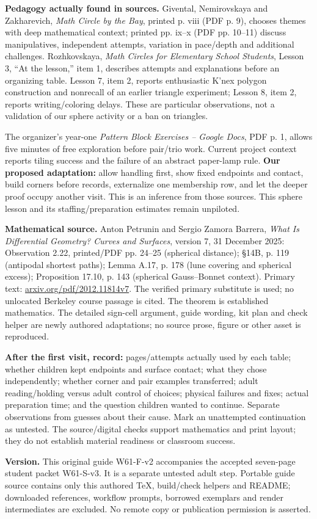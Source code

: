 \documentclass[11pt,letterpaper]{article}
\begin{document}
\textbf{Pedagogy actually found in sources.} Givental, Nemirovskaya and Zakharevich, \emph{Math Circle by the Bay}, printed p. viii (PDF p. 9), chooses themes with deep mathematical context; printed pp. ix--x (PDF pp. 10--11) discuss manipulatives, independent attempts, variation in pace/depth and additional challenges. Rozhkovskaya, \emph{Math Circles for Elementary School Students}, Lesson 3, ``At the lesson,'' item 1, describes attempts and explanations before an organizing table. Lesson 7, item 2, reports enthusiastic K'nex polygon construction and nonrecall of an earlier triangle experiment; Lesson 8, item 2, reports writing/coloring delays. These are particular observations, not a validation of our sphere activity or a ban on triangles.

The organizer's year-one \emph{Pattern Block Exercises -- Google Docs}, PDF p. 1, allows five minutes of free exploration before pair/trio work. Current project context reports tiling success and the failure of an abstract paper-lamp rule. \textbf{Our proposed adaptation:} allow handling first, show fixed endpoints and contact, build corners before records, externalize one membership row, and let the deeper proof occupy another visit. This is an inference from those sources. This sphere lesson and its staffing/preparation estimates remain unpiloted.

\textbf{Mathematical source.} Anton Petrunin and Sergio Zamora Barrera, \emph{What Is Differential Geometry? Curves and Surfaces}, version 7, 31 December 2025: Observation 2.22, printed/PDF pp. 24--25 (spherical distance); \S14B, p. 119 (antipodal shortest paths); Lemma A.17, p. 178 (lune covering and spherical excess); Proposition 17.10, p. 143 (spherical Gauss--Bonnet context). Primary text: \href{https://arxiv.org/pdf/2012.11814v7}{arxiv.org/pdf/2012.11814v7}. The verified primary substitute is used; no unlocated Berkeley course passage is cited. The theorem is established mathematics. The detailed sign-cell argument, guide wording, kit plan and check helper are newly authored adaptations; no source prose, figure or other asset is reproduced.

\textbf{After the first visit, record:} pages/attempts actually used by each table; whether children kept endpoints and surface contact; what they chose independently; whether corner and pair examples transferred; adult reading/holding versus adult control of choices; physical failures and fixes; actual preparation time; and the question children wanted to continue. Separate observations from guesses about their cause. Mark an unattempted continuation as untested. The source/digital checks support mathematics and print layout; they do not establish material readiness or classroom success.

\textbf{Version.} This original guide W61-F-v2 accompanies the accepted seven-page student packet W61-S-v3. It is a separate untested adult step. Portable guide source contains only this authored TeX, build/check helpers and README; downloaded references, workflow prompts, borrowed exemplars and render intermediates are excluded. No remote copy or publication permission is asserted.
\end{document}

